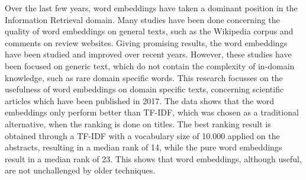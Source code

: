 \documentclass[../../Thesis.tex]{subfiles}
\begin{document}
Over the last few years, word embeddings have taken a dominant position in the Information Retrieval domain. Many studies have been done concerning the quality of word embeddings on general texts, such as the Wikipedia corpus and comments on review websites. Giving promising results, the word embeddings have been studied and improved over recent years. However, these studies have been focused on generic text, which do not contain the complexity of in-domain knowledge, such as rare domain specific words. This research focusses on the usefulness of word embeddings on domain specific texts, concerning scientific articles which have been published in 2017. The data shows that the word embeddings only perform better than TF-IDF, which was chosen as a traditional alternative, when the ranking is done on titles. The best ranking result is obtained through a TF-IDF with a vocabulary size of 10.000 applied on the abstracts, resulting in a median rank of 14, while the pure word embeddings result in a median rank of 23. This shows that word embeddings, although useful, are not unchallenged by older techniques.
\end{document}
